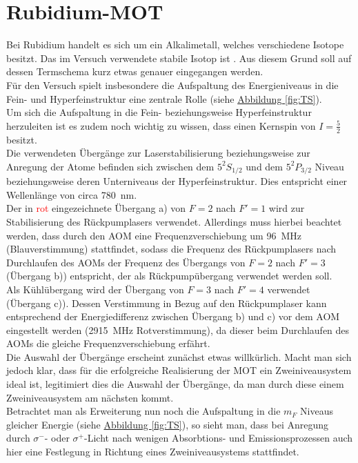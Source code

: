 \documentclass[
class=book,
accentcolor=1b,
custommargins=geometry,
fontsize=11pt,
thesis={type=Versuchsanleitung},
ruledheaders=all,
headline=false,
instbox=false,
marginpar=false,
title=small,
ignore-missing-data=true,
twoside=false,
logofile=apqdesign/tuda_logo.pdf,
pdfa=false %
]{apqpub}
\begin{document}
					\section{Rubidium-MOT}					
					Bei Rubidium handelt es sich um ein Alkalimetall, welches verschiedene Isotope besitzt. 
					Das im Versuch verwendete stabile Isotop ist . Aus diesem Grund soll auf dessen Termschema kurz etwas genauer eingegangen werden.\\
					Für den Versuch spielt insbesondere die Aufspaltung des Energieniveaus in die Fein- und Hyperfeinstruktur eine zentrale Rolle (siehe \hyperref[fig:TS]{Abbildung \ref{fig:TS}}).\\
					Um sich die Aufspaltung in die Fein- beziehungsweise Hyperfeinstruktur herzuleiten ist es zudem noch wichtig zu wissen, dass  einen Kernspin von $I=\frac{5}{2}$ besitzt.\\ 
					Die verwendeten Übergänge zur Laserstabilisierung beziehungsweise zur Anregung der Atome befinden sich zwischen dem $5^2S_{1/2}$ und dem $5^2P_{3/2}$ Niveau beziehungsweise deren Unterniveaus der Hyperfeinstruktur. 
					Dies entspricht einer Wellenlänge von circa \qty{780}{\nano\metre}.\\
					Der in \textcolor{red}{rot} eingezeichnete Übergang a) von $F=2$ nach $F'=1$ wird zur Stabilisierung des Rückpumplasers verwendet. 
					Allerdings muss hierbei beachtet werden, dass durch den AOM eine Frequenzverschiebung um \qty{96}{\mega\hertz} (Blauverstimmung) stattfindet, sodass die Frequenz des Rückpumplasers nach Durchlaufen des AOMs der Frequenz des Übergangs von $F=2$ nach $F'=3$ (Übergang b)) entspricht, der als Rückpumpübergang verwendet werden soll.\\
					Als Kühlübergang wird der Übergang von $F=3$ nach $F'=4$ verwendet (Übergang c)). 
					Dessen Verstimmung in Bezug auf den Rückpumplaser kann entsprechend der Energiedifferenz zwischen Übergang b) und c) vor dem AOM eingestellt werden (\qty{2915}{\mega\Hz} Rotverstimmung), da dieser beim Durchlaufen des AOMs die gleiche Frequenzverschiebung erfährt.\\   
					Die Auswahl der Übergänge erscheint zunächst etwas willkürlich. Macht man sich jedoch klar, dass für die erfolgreiche Realisierung der MOT ein Zweiniveausystem ideal ist, legitimiert dies die Auswahl der Übergänge, da man durch diese einem Zweiniveausystem am nächsten kommt.\\
					Betrachtet man als Erweiterung nun noch die Aufspaltung in die $m_F$ Niveaus gleicher Energie (siehe \hyperref[fig:TS]{Abbildung \ref{fig:TS}}), so sieht man, dass bei Anregung durch $\sigma^-$- oder $\sigma^+$-Licht nach wenigen Absorbtions- und Emissionsprozessen auch hier eine Festlegung in Richtung eines Zweiniveausystems stattfindet.\\  
\end{document}
